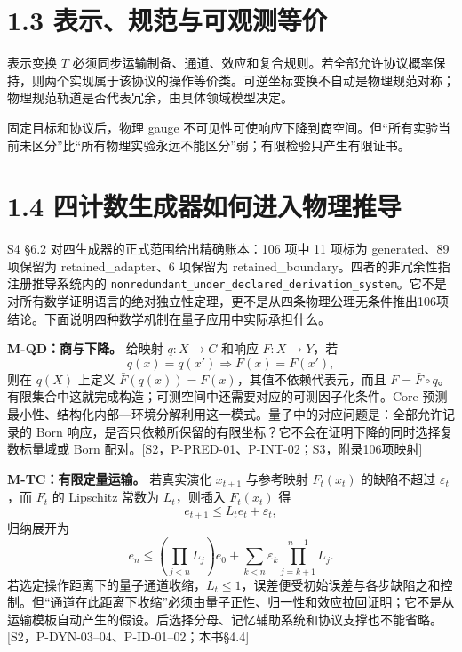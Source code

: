 \documentclass[
  11pt,
  oneside]{book}
\begin{document}
\hypertarget{ux8868ux793aux89c4ux8303ux4e0eux53efux89c2ux6d4bux7b49ux4ef7}{%
\section{1.3
表示、规范与可观测等价}\label{ux8868ux793aux89c4ux8303ux4e0eux53efux89c2ux6d4bux7b49ux4ef7}}

表示变换 \(T\)
必须同步运输制备、通道、效应和复合规则。若全部允许协议概率保持，则两个实现属于该协议的操作等价类。可逆坐标变换不自动是物理规范对称；物理规范轨道是否代表冗余，由具体领域模型决定。

固定目标和协议后，物理 gauge
不可见性可使响应下降到商空间。但``所有实验当前未区分''比``所有物理实验永远不能区分''弱；有限检验只产生有限证书。

\hypertarget{ux56dbux8ba1ux6570ux751fux6210ux5668ux5982ux4f55ux8fdbux5165ux7269ux7406ux63a8ux5bfc}{%
\section{1.4
四计数生成器如何进入物理推导}\label{ux56dbux8ba1ux6570ux751fux6210ux5668ux5982ux4f55ux8fdbux5165ux7269ux7406ux63a8ux5bfc}}

S4 §6.2 对四生成器的正式范围给出精确账本：106 项中 11 项标为
generated、89 项保留为 retained\_\allowbreak adapter、6 项保留为
retained\_\allowbreak boundary。四者的非冗余性指注册推导系统内的
\texttt{nonredundant\_\allowbreak under\_\allowbreak declared\_\allowbreak derivation\_\allowbreak system}。它不是对所有数学证明语言的绝对独立性定理，更不是从四条物理公理无条件推出106项结论。下面说明四种数学机制在量子应用中实际承担什么。

\textbf{M-QD：商与下降。} 给映射 \(q:X\to C\) 和响应 \(F:X\to Y\)，若 \[
q(x)=q(x')\Longrightarrow F(x)=F(x'),
\] 则在 \(q(X)\) 上定义 \(\bar F(q(x))=F(x)\)，其值不依赖代表元，而且
\(F=\bar F\circ q\)。有限集合中这就完成构造；可测空间中还需要对应的可测因子化条件。Core
预测最小性、结构化内部---环境分解利用这一模式。量子中的对应问题是：全部允许记录的
Born
响应，是否只依赖所保留的有限坐标？它不会在证明下降的同时选择复数标量域或
Born 配对。{[}S2，P-PRED-01、P-INT-02；S3，附录106项映射{]}

\textbf{M-TC：有限定量运输。} 若真实演化 \(x_{t+1}\) 与参考映射
\(F_t(x_t)\) 的缺陷不超过 \(\varepsilon_t\)，而 \(F_t\) 的 Lipschitz
常数为 \(L_t\)，则插入 \(F_t(x_t)\) 得 \[
e_{t+1}\le L_te_t+\varepsilon_t,
\] 归纳展开为 \[
e_n\le\left(\prod_{j<n}L_j\right)e_0+
\sum_{k<n}\varepsilon_k\prod_{j=k+1}^{n-1}L_j.
\]
若选定操作距离下的量子通道收缩，\(L_t\le1\)，误差便受初始误差与各步缺陷之和控制。但``通道在此距离下收缩''必须由量子正性、归一性和效应拉回证明；它不是从运输模板自动产生的假设。后选择分母、记忆辅助系统和协议支撑也不能省略。{[}S2，P-DYN-03--04、P-ID-01--02；本书§4.4{]}
\end{document}
